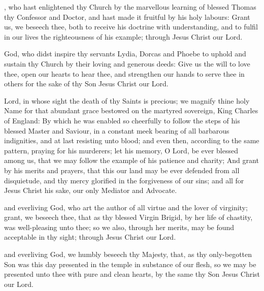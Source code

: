 , who hast enlightened thy Church by the marvellous learning of blessed Thomas thy Confessor and Doctor, and hast made it fruitful by his holy labours: Grant us, we beseech thee, both to receive his doctrine with understanding, and to fulfil in our lives the righteousness of his example; through Jesus Christ our Lord.

 God, who didst inspire thy servants Lydia, Dorcas and Phoebe to uphold and sustain thy Church by their loving and generous deeds: Give us the will to love thee, open our hearts to hear thee, and strengthen our hands to serve thee in others for the sake of thy Son Jesus Christ our Lord.

 Lord, in whose sight the death of thy Saints is precious; we magnify thine holy Name for that abundant grace bestowed on the martyred sovereign, King Charles of England: By which he was enabled so cheerfully to follow the steps of his blessed Master and Saviour, in a constant meek bearing of all barbarous indignities, and at last resisting unto blood; and even then, according to the same pattern, praying for his murderers; let his memory, O Lord, be ever blessed among us, that we may follow the example of his patience and charity; And grant by his merits and prayers, that this our land may be ever defended from all disquietude, and thy mercy glorified in the forgiveness of our sins; and all for Jesus Christ his sake, our only Mediator and Advocate.

 and everliving God, who art the author of all virtue and the lover of virginity; grant, we beseech thee, that as thy blessed Virgin Brigid, by her life of chastity, was well-pleasing unto thee; so we also, through her merits, may be found acceptable in thy sight; through Jesus Christ our Lord.

 and everliving God, we humbly beseech thy Majesty, that, as thy only-begotten Son was this day presented in the temple in substance of our flesh, so we may be presented unto thee with pure and clean hearts, by the same thy Son Jesus Christ our Lord.


